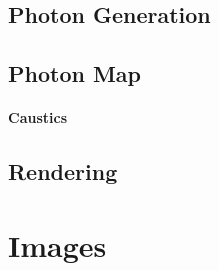 \documentclass[a4paper]{article}
\begin{document}
\subsection{Photon Generation}

\subsection{Photon Map}

\paragraph{Caustics}

\subsection{Rendering}

\pagebreak
\printbibliography
\pagebreak
\appendix
\section{Images}
\end{document}
